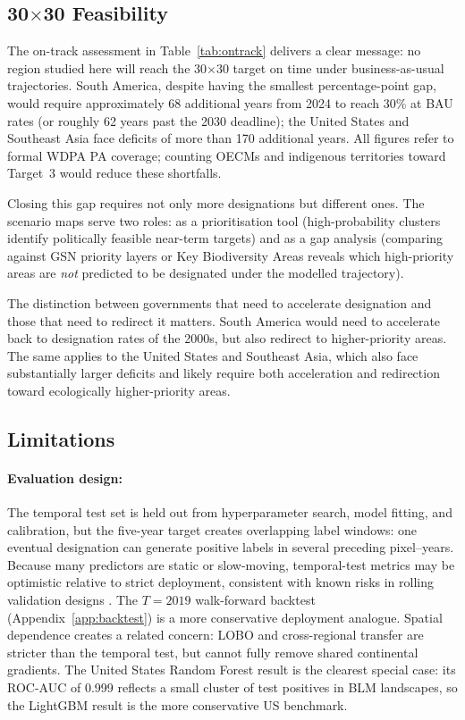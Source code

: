 \documentclass[12pt]{article}
\theoremstyle{break}
\begin{document}
\subsection{30$\times$30 Feasibility}
\label{sec:disc_forward}
The on-track assessment in Table~\ref{tab:ontrack} delivers a clear message: no region
studied here will reach the 30$\times$30 target on time under business-as-usual
trajectories. South America, despite having the smallest percentage-point gap, would require
approximately 68 additional years from 2024 to reach 30\% at BAU rates (or roughly
62 years past the 2030 deadline); the United States and Southeast Asia face
deficits of more than 170 additional years. All figures refer to formal WDPA PA
coverage; counting OECMs and indigenous territories toward Target~3 would reduce
these shortfalls.

Closing this gap requires not only more designations but different ones. The
scenario maps serve two roles: as a prioritisation tool (high-probability clusters
identify politically feasible near-term targets) and as a gap analysis (comparing
against GSN priority layers or Key Biodiversity Areas reveals which high-priority
areas are \emph{not} predicted to be designated under the modelled trajectory).

The distinction between governments that need to accelerate designation and
those that need to redirect it matters. South America would need to
accelerate back to designation rates of the 2000s, but also redirect to 
higher-priority areas. The same applies to the United States and 
Southeast Asia, which also face substantially larger deficits
and likely require both acceleration and redirection toward ecologically
higher-priority areas.

\subsection{Limitations}
\label{sec:discussion_limitations}

\paragraph{Evaluation design:}
The temporal test set is held out from hyperparameter search, model fitting, and
calibration, but the five-year target creates overlapping label windows: one eventual
designation can generate positive labels in several preceding pixel--years. Because
many predictors are static or slow-moving, temporal-test metrics may be optimistic
relative to strict deployment, consistent with known risks in rolling validation
designs \citep{lopezdeprado2018, cerqueira2020}. The $T=2019$ walk-forward backtest
(Appendix~\ref{app:backtest}) is a more conservative deployment analogue.
Spatial dependence creates a related concern: LOBO and cross-regional transfer are
stricter than the temporal test, but cannot fully remove shared continental gradients.
The United States Random Forest result is the clearest special case: its ROC-AUC of
0.999 reflects a small cluster of test positives in BLM landscapes, so the LightGBM
result is the more conservative US benchmark.
\end{document}
